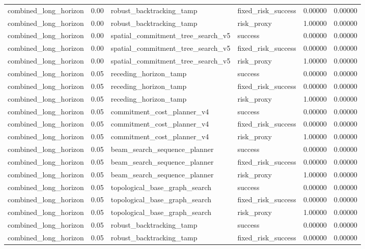 \documentclass{article}
\begin{document}
\begin{table}[tbp]
{\begin{tabular}{llllll}
combined\_long\_horizon & 0.00 & robust\_backtracking\_tamp & fixed\_risk\_success & 0.00000 & 0.00000 \\
combined\_long\_horizon & 0.00 & robust\_backtracking\_tamp & risk\_proxy & 1.00000 & 0.00000 \\
combined\_long\_horizon & 0.00 & spatial\_commitment\_tree\_search\_v5 & success & 0.00000 & 0.00000 \\
combined\_long\_horizon & 0.00 & spatial\_commitment\_tree\_search\_v5 & fixed\_risk\_success & 0.00000 & 0.00000 \\
combined\_long\_horizon & 0.00 & spatial\_commitment\_tree\_search\_v5 & risk\_proxy & 1.00000 & 0.00000 \\
combined\_long\_horizon & 0.05 & receding\_horizon\_tamp & success & 0.00000 & 0.00000 \\
combined\_long\_horizon & 0.05 & receding\_horizon\_tamp & fixed\_risk\_success & 0.00000 & 0.00000 \\
combined\_long\_horizon & 0.05 & receding\_horizon\_tamp & risk\_proxy & 1.00000 & 0.00000 \\
combined\_long\_horizon & 0.05 & commitment\_cost\_planner\_v4 & success & 0.00000 & 0.00000 \\
combined\_long\_horizon & 0.05 & commitment\_cost\_planner\_v4 & fixed\_risk\_success & 0.00000 & 0.00000 \\
combined\_long\_horizon & 0.05 & commitment\_cost\_planner\_v4 & risk\_proxy & 1.00000 & 0.00000 \\
combined\_long\_horizon & 0.05 & beam\_search\_sequence\_planner & success & 0.00000 & 0.00000 \\
combined\_long\_horizon & 0.05 & beam\_search\_sequence\_planner & fixed\_risk\_success & 0.00000 & 0.00000 \\
combined\_long\_horizon & 0.05 & beam\_search\_sequence\_planner & risk\_proxy & 1.00000 & 0.00000 \\
combined\_long\_horizon & 0.05 & topological\_base\_graph\_search & success & 0.00000 & 0.00000 \\
combined\_long\_horizon & 0.05 & topological\_base\_graph\_search & fixed\_risk\_success & 0.00000 & 0.00000 \\
combined\_long\_horizon & 0.05 & topological\_base\_graph\_search & risk\_proxy & 1.00000 & 0.00000 \\
combined\_long\_horizon & 0.05 & robust\_backtracking\_tamp & success & 0.00000 & 0.00000 \\
combined\_long\_horizon & 0.05 & robust\_backtracking\_tamp & fixed\_risk\_success & 0.00000 & 0.00000 \\

\end{tabular}}
\end{table}
\end{document}
